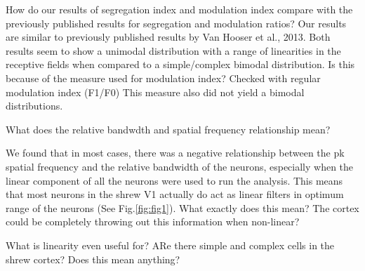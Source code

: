 		How do our results of segregation index and modulation index compare with the previously published results for segregation and modulation ratios?  Our results are similar to previously published results by Van Hooser et al., 2013. Both results seem to show a unimodal distribution with a range of linearities in the receptive fields when compared to a simple/complex bimodal distribution. Is this because of the measure used for modulation index? Checked with regular modulation index (F1/F0) This measure also did not yield a bimodal distributions.
		
		What does the relative bandwdth and spatial frequency relationship mean?
		
		We found that in most cases, there was a negative relationship between the pk spatial frequency and the relative bandwidth of the neurons, especially when the linear component of all the neurons were used to run the analysis. This means that most neurons in the shrew V1 actually do act as linear filters in optimum range of the neurons (See Fig.\ref{fig:fig1}).
		What exactly does this mean? The cortex could be completely throwing out this information when non-linear?
		
		What is linearity even useful for?
		ARe there simple and complex cells in the shrew cortex? Does this mean anything?